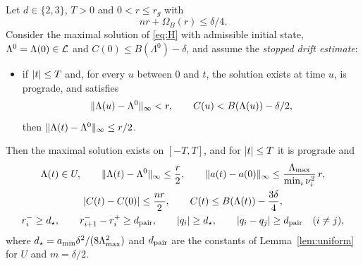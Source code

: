 \begin{lemma}
\label{lem:exit}
Let $d\in\{2,3\}$, $T>0$ and $0<r\le r_g$ with
\begin{equation}
\label{eq:stop}
nr+\Omega_B(r)\le\delta/4.
\end{equation}
Consider the maximal solution of \eqref{eq:H} with admissible initial state, $\Lambda^0=\Lambda(0)\in\mathcal{L}$ and $C(0)\le B(\Lambda^0)-\delta$, and assume the \emph{stopped drift estimate}:
\begin{itemize}
\item[(SD)] if $\lvert t\rvert\le T$ and, for every $u$ between $0$ and $t$, the solution exists at time $u$, is prograde, and satisfies
\begin{equation}
\label{eq:stopped}
\lVert \Lambda(u)-\Lambda^0\rVert_\infty<r,\qquad C(u)<B(\Lambda(u))-\delta/2,
\end{equation}
then $\lVert \Lambda(t)-\Lambda^0\rVert_\infty\le r/2$.
\end{itemize}
Then the maximal solution exists on $[-T,T]$, and for $\lvert t\rvert\le T$ it is prograde and
\begin{gather*}
\Lambda(t)\in U,\qquad \lVert \Lambda(t)-\Lambda^0\rVert_\infty\le\frac r2,\qquad \lVert a(t)-a(0)\rVert_\infty\le\frac{\Lambda_{\max}}{\min_i\nu_i^2}\,r,\\
\lvert C(t)-C(0)\rvert\le\frac{nr}2,\qquad C(t)\le B(\Lambda(t))-\frac{3\delta}4,\\
r_i^-\ge d_\star,\qquad r_{i+1}^--r_i^+\ge d_{\mathrm{pair}},\qquad \lvert q_i\rvert\ge d_\star,\qquad \lvert q_i-q_j\rvert\ge d_{\mathrm{pair}}\quad(i\ne j),
\end{gather*}
where $d_\star=a_{\min}\delta^2/(8\Lambda_{\max}^2)$ and $d_{\mathrm{pair}}$ are the constants of Lemma~\ref{lem:uniform} for $U$ and $m=\delta/2$.
\end{lemma}

